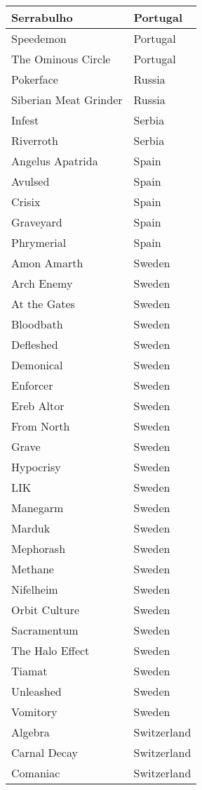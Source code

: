 \documentclass[12pt, a4paper, twoside]{report}
\begin{document}
\begin{center}
\begin{longtable}{|p{5cm}|p{5cm}|}
Serrabulho & Portugal \\ \hline
Speedemon & Portugal \\ \hline
The Ominous Circle & Portugal \\ \hline
Pokerface & Russia \\ \hline
Siberian Meat Grinder & Russia \\ \hline
Infest & Serbia \\ \hline
Riverroth & Serbia \\ \hline
Angelus Apatrida & Spain \\ \hline
Avulsed & Spain \\ \hline
Crisix & Spain \\ \hline
Graveyard & Spain \\ \hline
Phrymerial & Spain \\ \hline
Amon Amarth & Sweden \\ \hline
Arch Enemy & Sweden \\ \hline
At the Gates & Sweden \\ \hline
Bloodbath & Sweden \\ \hline
Defleshed & Sweden \\ \hline
Demonical & Sweden \\ \hline
Enforcer & Sweden \\ \hline
Ereb Altor & Sweden \\ \hline
From North & Sweden \\ \hline
Grave & Sweden \\ \hline
Hypocrisy & Sweden \\ \hline
LIK & Sweden \\ \hline
Manegarm & Sweden \\ \hline
Marduk & Sweden \\ \hline
Mephorash & Sweden \\ \hline
Methane & Sweden \\ \hline
Nifelheim & Sweden \\ \hline
Orbit Culture & Sweden \\ \hline
Sacramentum﻿ & Sweden \\ \hline
The Halo Effect & Sweden \\ \hline
Tiamat & Sweden \\ \hline
Unleashed & Sweden \\ \hline
Vomitory & Sweden \\ \hline
Algebra & Switzerland \\ \hline
Carnal Decay & Switzerland \\ \hline
Comaniac & Switzerland \\ \hline

\end{longtable}
\end{center}
\end{document}
